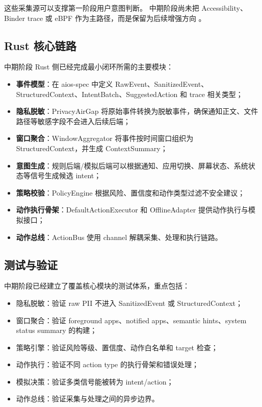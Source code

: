 \documentclass[12pt,a4paper]{article}
\begin{document}
这些采集源可以支撑第一阶段用户意图判断。
中期阶段尚未把 Accessibility、Binder trace 或 eBPF 作为主路径，而是保留为后续增强方向 \cite{android-accessibility}。

\subsection{Rust 核心链路}\label{subsec:rust-core}

中期阶段 Rust 侧已经完成最小闭环所需的主要模块：

\begin{itemize}
  \item \textbf{事件模型}：在 aios-spec 中定义 RawEvent、SanitizedEvent、StructuredContext、IntentBatch、SuggestedAction 和 trace 相关类型；
  \item \textbf{隐私脱敏}：PrivacyAirGap 将原始事件转换为脱敏事件，确保通知正文、文件路径等敏感字段不会进入后续后端；
  \item \textbf{窗口聚合}：WindowAggregator 将事件按时间窗口组织为 StructuredContext，并生成 ContextSummary；
  \item \textbf{意图生成}：规则后端/模拟后端可以根据通知、应用切换、屏幕状态、系统状态等信号生成候选 intent；
  \item \textbf{策略校验}：PolicyEngine 根据风险、置信度和动作类型过滤不安全建议；
  \item \textbf{动作执行骨架}：DefaultActionExecutor 和 OfflineAdapter 提供动作执行与模拟接口；
  \item \textbf{动作总线}：ActionBus 使用 channel 解耦采集、处理和执行链路。
\end{itemize}

\subsection{测试与验证}\label{subsec:testing}

中期阶段已经建立了覆盖核心模块的测试体系，重点包括：

\begin{itemize}
  \item 隐私脱敏：验证 raw PII 不进入 SanitizedEvent 或 StructuredContext；
  \item 窗口聚合：验证 foreground apps、notified apps、semantic hints、system status summary 的构建；
  \item 策略引擎：验证风险等级、置信度、动作白名单和 target 检查；
  \item 动作执行：验证不同 action type 的执行骨架和错误处理；
  \item 模拟决策：验证多类信号能被转为 intent/action；
  \item 动作总线：验证采集与处理之间的异步边界。
\end{itemize}
\end{document}
